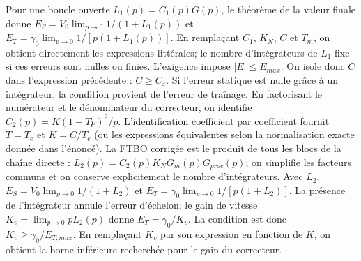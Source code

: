 \begin{corrigebox}
Pour une boucle ouverte $L_1(p)=C_1(p)G(p)$, le théorème de la valeur finale
        donne $E_S=V_0\lim_{p\to0}1/(1+L_1(p))$ et
        $E_T=\gamma_0\lim_{p\to0}1/[p(1+L_1(p))]$. En remplaçant
        $C_1$, $K_N$, $C$ et $T_m$, on obtient directement les expressions littérales;
        le nombre d'intégrateurs de $L_1$ fixe si ces erreurs sont nulles ou finies.
L'exigence impose $|E|\le E_{max}$. On isole donc $C$ dans l'expression
        précédente : $C\ge C_\varepsilon$. Si l'erreur statique est nulle grâce à un
        intégrateur, la condition provient de l'erreur de traînage.
En factorisant le numérateur et le dénominateur du correcteur, on identifie
        $C_2(p)=K(1+Tp)^2/p$. L'identification coefficient par coefficient fournit
        $T=T_e$ et $K=C/T_e$ (ou les expressions équivalentes selon la normalisation
        exacte donnée dans l'énoncé).
La FTBO corrigée est le produit de tous les blocs de la chaîne directe :
        $L_2(p)=C_2(p)K_NG_m(p)G_{proc}(p)$; on simplifie les facteurs communs et on
        conserve explicitement le nombre d'intégrateurs.
Avec $L_2$, $E_S=V_0\lim_{p\to0}1/(1+L_2)$ et
        $E_T=\gamma_0\lim_{p\to0}1/[p(1+L_2)]$. La présence de l'intégrateur annule
        l'erreur d'échelon; le gain de vitesse $K_v=\lim_{p\to0}pL_2(p)$ donne
        $E_T=\gamma_0/K_v$.
La condition est donc $K_v\ge\gamma_0/E_{T,max}$. En remplaçant $K_v$ par
        son expression en fonction de $K$, on obtient la borne inférieure recherchée pour
        le gain du correcteur.
\end{corrigebox}
